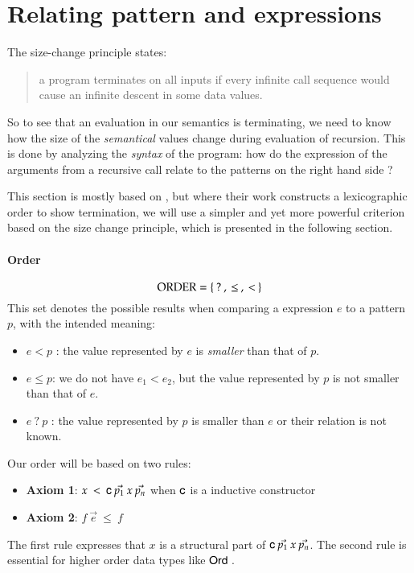 \newcommand{\order}{\opn{ORDER}}

\section{Relating pattern and expressions}


The size-change principle \cite{lee01sizechange} states:
\begin{quote}
a program terminates on all inputs if every infinite call sequence would cause an infinite descent in some data values.
\end{quote}

So to see that an evaluation in our semantics is terminating, we need to know how the size of the \emph{semantical} values change during evaluation of recursion.
This is done by analyzing the \emph{syntax} of the program: how do the expression of the arguments from a recursive call relate to the patterns on the right hand side ?

This section is mostly based on \cite{abelAltenkirch:predStRec}, but where their work constructs a lexicographic order to show termination, we will use a simpler and yet more powerful criterion based on the size change principle, which is presented in the following section.

\paragraph*{Order}
\[ \order = \{ \: ? \: , \: \leq \: , \: < \: \} \]
\noindent This set denotes the possible results when comparing a expression $e$ to a pattern $p$, with the intended meaning:
\begin{itemize}
\item
$e < p$ : the value represented by $e$ is \emph{smaller} than that of $p$.
\item
$e \leq p $: we do not have $e_1 < e_2$, but the value represented by $p$ is not smaller than that of $e$.
\item
$e \: ? \: p $ : the value represented by $p$ is smaller than $e$ or their relation is not known.
\end{itemize}
Our order will be based on two rules:
\begin{itemize}
\item
\textbf{Axiom 1}: $x \: < \: \mathsf{c} \: \vec{p_1} \: x \: \vec{p_n} $ when $\mathsf{c}$ is a inductive constructor
\item
\textbf{Axiom 2}: $f \: \vec{e} \: \leq \: f $
\end{itemize}
The first rule expresses that $x$ is a structural part of $\mathsf{c} \: \vec{p_1} \: x \: \vec{p_n}$.
The second rule is essential for higher order data types like $\mathsf{Ord}\:$.


